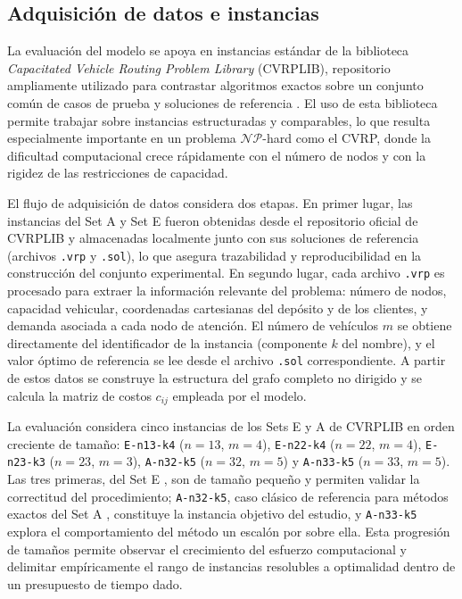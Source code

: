 \subsection{Adquisición de datos e instancias}

La evaluación del modelo se apoya en instancias estándar de la biblioteca
\textit{Capacitated Vehicle Routing Problem Library} (CVRPLIB), repositorio ampliamente
utilizado para contrastar algoritmos exactos sobre un conjunto común de casos de prueba
y soluciones de referencia \parencite{cvrplib}. El uso de esta biblioteca permite
trabajar sobre instancias estructuradas y comparables, lo que resulta especialmente
importante en un problema $\mathcal{NP}$-hard como el CVRP, donde la dificultad
computacional crece rápidamente con el número de nodos y con la rigidez de las
restricciones de capacidad.

El flujo de adquisición de datos considera dos etapas. En primer lugar, las
instancias del Set A y Set E fueron obtenidas desde el repositorio oficial de CVRPLIB
y almacenadas localmente junto con sus soluciones de referencia (archivos
\texttt{.vrp} y \texttt{.sol}), lo que asegura trazabilidad y reproducibilidad
en la construcción del conjunto experimental. En segundo lugar, cada archivo
\texttt{.vrp} es procesado para extraer la información relevante del problema:
número de nodos, capacidad vehicular, coordenadas cartesianas del depósito y
de los clientes, y demanda asociada a cada nodo de atención. El número de
vehículos $m$ se obtiene directamente del identificador de la instancia
(componente $k$ del nombre), y el valor óptimo de referencia se lee desde el
archivo \texttt{.sol} correspondiente. A partir de estos datos se construye la
estructura del grafo completo no dirigido y se calcula la matriz de costos
$c_{ij}$ empleada por el modelo.

La evaluación considera cinco instancias de los Sets E y A de CVRPLIB en orden
creciente de tamaño: \texttt{E-n13-k4} ($n=13$, $m=4$), \texttt{E-n22-k4}
($n=22$, $m=4$), \texttt{E-n23-k3} ($n=23$, $m=3$), \texttt{A-n32-k5} ($n=32$,
$m=5$) y \texttt{A-n33-k5} ($n=33$, $m=5$). Las tres primeras, del Set E 
\parencite{christofides1981exact}, son de tamaño pequeño y permiten validar la
correctitud del procedimiento; \texttt{A-n32-k5}, caso clásico de referencia
para métodos exactos del Set A \parencite{augerat1995}, constituye la
instancia objetivo del estudio, y \texttt{A-n33-k5} explora el comportamiento
del método un escalón por sobre ella. Esta progresión de tamaños permite
observar el crecimiento del esfuerzo computacional y delimitar empíricamente el
rango de instancias resolubles a optimalidad dentro de un presupuesto de tiempo
dado.

